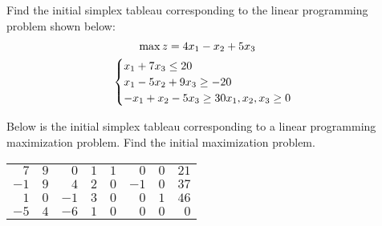 \documentclass[11pt,letterpaper]{article}
\begin{document}

 Find the initial simplex tableau corresponding to the linear programming problem shown below:
	\[
	\begin{gathered}
	\hspace{-0.7cm} \max z= 4x_1 - x_2 + 5x_3 \\
	\begin{cases}
	x_1 + 7x_3 \leq 20 \\
	x_1 - 5x_2 + 9x_3 \geq -20 \\
	-x_1 + x_2 - 5x_3 \geq30
	x_1, x_2, x_3 \geq 0
	\end{cases}
	\end{gathered}
	\]



\newpage



 Below is the initial simplex tableau corresponding to a linear programming maximization problem. Find the initial maximization problem. \par
	\begin{table}[H]
	\centering
	\begin{tabular}{rrrrrrrr}
	$7$ & $9$ & $0$ & $1$ & $1$ & $0$ & $0$ & $21$ \\
	$-1$ & $9$ & $4$ & $2$ & $0$ & $-1$ & $0$ & $37$ \\
	$1$ & $0$ & $-1$ & $3$ & $0$ & $0$ & $1$ & $46$ \\
	$-5$ & $4$ & $-6$ & $1$ & $0$ & $0$ & $0$ & $0$ \\
	\end{tabular}
	\end{table}



\newpage
\end{document}
